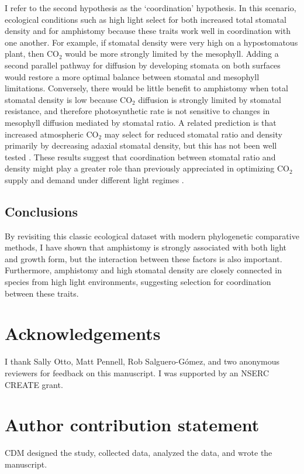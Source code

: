 \documentclass[12pt, oneside]{article}
\begin{document}
I refer to the second hypothesis as the `coordination' hypothesis. In this scenario, ecological conditions such as high light select for both increased total stomatal density and for amphistomy because these traits work well in coordination with one another. For example, if stomatal density were very high on a hypostomatous plant, then CO$_2$ would be more strongly limited by the mesophyll. Adding a second parallel pathway for diffusion by developing stomata on both surfaces would restore a more optimal balance between stomatal and mesophyll limitations. Conversely, there would be little benefit to amphistomy when total stomatal density is low because CO$_2$ diffusion is strongly limited by stomatal resistance, and therefore photosynthetic rate is not sensitive to changes in mesophyll diffusion mediated by stomatal ratio. A related prediction is that increased atmospheric CO$_2$ may select for reduced stomatal ratio and density primarily by decreasing adaxial stomatal density, but this has not been well tested \citep[but see][]{Woodward_Bazzaz_1988}. These results suggest that coordination between stomatal ratio and density might play a greater role than previously appreciated in optimizing CO$_2$ supply and demand under different light regimes \citep[see also][]{Beerling_Kelly_1996}.

\subsection*{Conclusions}

By revisiting this classic ecological dataset with modern phylogenetic comparative methods, I have shown that amphistomy is strongly associated with both light and growth form, but the interaction between these factors is also important. Furthermore, amphistomy and high stomatal density are closely connected in species from high light environments, suggesting selection for coordination between these traits.


\section*{Acknowledgements}
I thank Sally Otto, Matt Pennell, Rob Salguero-G\'{o}mez, and two anonymous reviewers for feedback on this manuscript. I was supported by an NSERC CREATE grant.

\section*{Author contribution statement}
CDM designed the study, collected data, analyzed the data, and wrote the manuscript.
\end{document}
